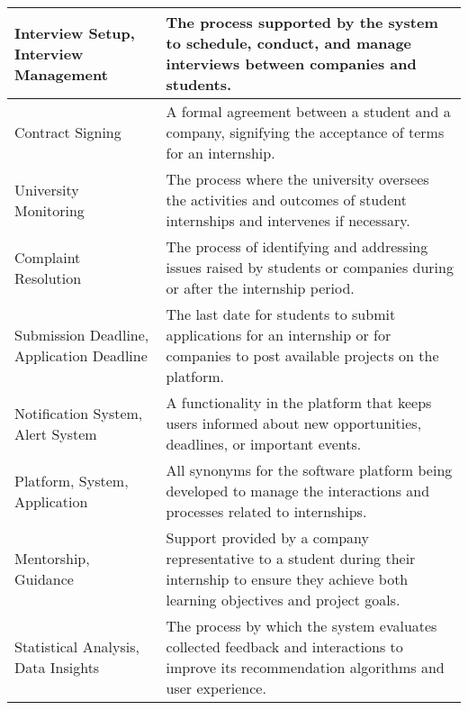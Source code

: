 \begin{longtable}{|p{}|p{}|}
        \hline
        Interview Setup, Interview Management & The process supported by the system to schedule, conduct, and manage interviews between companies and students. \\
        \hline
        Contract Signing & A formal agreement between a student and a company, signifying the acceptance of terms for an internship. \\
        \hline
        University Monitoring & The process where the university oversees the activities and outcomes of student internships and intervenes if necessary. \\
        \hline
        Complaint Resolution & The process of identifying and addressing issues raised by students or companies during or after the internship period. \\
        \hline
        Submission Deadline, Application Deadline & The last date for students to submit applications for an internship or for companies to post available projects on the platform. \\
        \hline
        Notification System, Alert System & A functionality in the platform that keeps users informed about new opportunities, deadlines, or important events. \\
        \hline
        Platform, System, Application & All synonyms for the software platform being developed to manage the interactions and processes related to internships. \\
        \hline
        Mentorship, Guidance & Support provided by a company representative to a student during their internship to ensure they achieve both learning objectives and project goals. \\
        \hline
        Statistical Analysis, Data Insights & The process by which the system evaluates collected feedback and interactions to improve its recommendation algorithms and user experience. \\
        \hline
        
    \end{longtable}
        